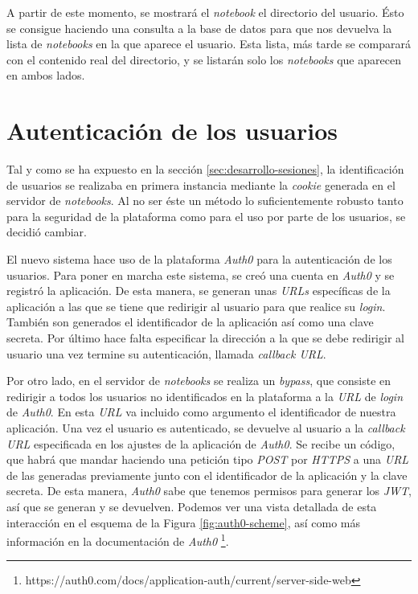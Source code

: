 \documentclass[11pt,spanish,listoffigures]{tfgetsinf}
\begin{document}
A partir de este momento, se mostrará el \textit{notebook} el directorio del usuario. Ésto se consigue haciendo una consulta a la base de datos para que nos devuelva la lista de \textit{notebooks} en la que aparece el usuario. Esta lista, más tarde se comparará con el contenido real del directorio, y se listarán solo los \textit{notebooks} que aparecen en ambos lados.



\section{Autenticación de los usuarios}
\label{sec:desarrollo-auth}

Tal y como se ha expuesto en la sección \ref{sec:desarrollo-sesiones}, la identificación de usuarios se realizaba en primera instancia mediante la \textit{cookie} generada en el servidor de \textit{notebooks}. Al no ser éste un método lo suficientemente robusto tanto para la seguridad de la plataforma como para el uso por parte de los usuarios, se decidió cambiar.

El nuevo sistema hace uso de la plataforma \textit{Auth0} para la autenticación de los usuarios. Para poner en marcha este sistema, se creó una cuenta en \textit{Auth0} y se registró la aplicación. De esta manera, se generan unas \textit{URLs} específicas de la aplicación a las que se tiene que redirigir al usuario para que realice su \textit{login}. También son generados el identificador de la aplicación así como una clave secreta. Por último hace falta especificar la dirección a la que se debe redirigir al usuario una vez termine su autenticación, llamada \textit{callback URL}. 

Por otro lado, en el servidor de \textit{notebooks} se realiza un \textit{bypass}, que consiste en redirigir a todos los usuarios no identificados en la plataforma a la \textit{URL} de \textit{login} de \textit{Auth0}. En esta \textit{URL} va incluido como argumento el identificador de nuestra aplicación. Una vez el usuario es autenticado, se devuelve al usuario a la \textit{callback URL} especificada en los ajustes de la aplicación de \textit{Auth0}. Se recibe un código, que habrá que mandar haciendo una petición tipo \textit{POST} por \textit{HTTPS} a una \textit{URL} de las generadas previamente junto con el identificador de la aplicación y la clave secreta. De esta manera, \textit{Auth0} sabe que tenemos permisos para generar los \textit{JWT}, así que se generan y se devuelven.
Podemos ver una vista detallada de esta interacción en el esquema de la Figura \ref{fig:auth0-scheme}, así como más información en la documentación de \textit{Auth0} \footnote{https://auth0.com/docs/application-auth/current/server-side-web}.
\end{document}
